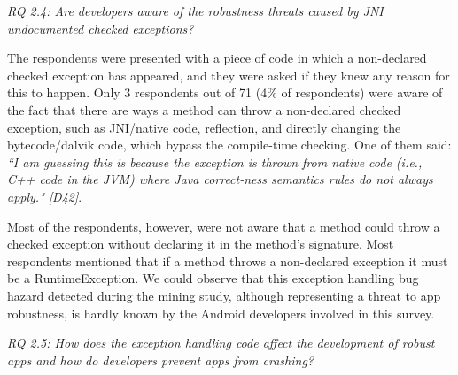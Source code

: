 \bigskip
\noindent\emph{RQ 2.4: Are developers aware of the robustness threats caused by JNI undocumented checked exceptions?}
\bigskip

The respondents were presented with a piece of code in which a non-declared checked exception has appeared, and they were asked if they knew any reason for this to happen. Only 3 respondents out of 71 (4\% of respondents) were aware of the fact that there are ways a method can throw a non-declared checked exception, such as JNI/native code, reflection, and directly changing the bytecode/dalvik code, which bypass the compile-time checking. One of them said: \emph{``I am guessing this is because the exception is thrown from native code (i.e., C++ code in the JVM) where Java correct-ness semantics rules do not always apply." [D42]}.  

Most of the respondents, however, were not aware that a method could throw a checked exception without declaring it in the method's signature. Most respondents mentioned that if a method throws a non-declared exception it must be a RuntimeException. We could observe that this exception handling bug hazard detected during the mining study, although representing a threat to app robustness, is hardly known by the Android developers involved in this survey. 

\bigskip 


\bigskip 





\noindent\emph{RQ 2.5: How does the exception handling code affect the development of robust apps and how do developers prevent apps from crashing?}

